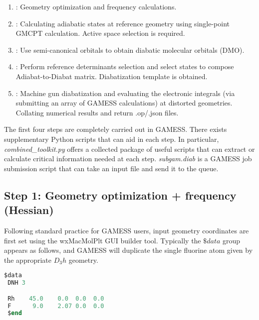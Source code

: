 \begin{enumerate}[nosep]
  \item {}: Geometry optimization and frequency calculations.
  \item {}: Calculating adiabatic states at reference geometry using single-point GMCPT calculation. Active space selection is required.
  \item {}: Use semi-canonical orbitals to obtain diabatic molecular orbitals (DMO). 
  \item {}: Perform reference determinants selection and select states to compose Adiabat-to-Diabat matrix. Diabatization template is obtained.
  \item {}: Machine gun diabatization and evaluating the electronic integrals (via submitting an array of GAMESS calculations) at distorted geometries. Collating numerical results and return .op/.json files.
\end{enumerate}


The first four steps are completely carried out in GAMESS. There exists supplementary Python scripts that can aid in each step. In particular, \textit{combined\_toolkit.py} offers a collected package of useful scripts that can extract or calculate critical information needed at each step. \textit{subgam.diab} is a GAMESS job submission script that can take an input file and send it to the queue.

\cleardoublepage


\subsection{Step 1: Geometry optimization + frequency (Hessian)\label{sec:cx-diabatization_in_practice_1}}

Following standard practice for GAMESS users, input geometry coordinates are first set using the wxMacMolPlt GUI builder tool. Typically the \textit{$\$data$} group appears as follows, and GAMESS will duplicate the single fluorine atom given by the appropriate $D_3h$ geometry.
\\
\begin{lstlisting}[language=Fortran, caption=Example RhF3 Input Geometry]
 $data
 DNH 3

 Rh    45.0    0.0  0.0  0.0
 F      9.0    2.07 0.0  0.0
 $end
\end{lstlisting}

